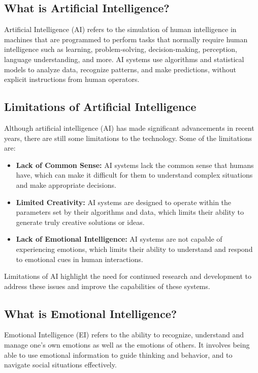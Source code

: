 \subsection{What is Artificial Intelligence?}
Artificial Intelligence (AI) refers to the simulation of human intelligence in machines that are programmed to perform tasks that normally require human intelligence such as learning, problem-solving, decision-making, perception, language understanding, and more\cite{ISSN-2456-2165}. AI systems use algorithms and statistical models to analyze data, recognize patterns, and make predictions, without explicit instructions from human operators.

\subsection{Limitations of Artificial Intelligence}
Although artificial intelligence (AI) has made significant advancements in recent years, there are still some limitations to the technology. Some of the limitations are:
\begin{itemize}
	\item \textbf{Lack of Common Sense:} AI systems lack the common sense that humans have, which can make it difficult for them to understand complex situations and make appropriate decisions.
	\item \textbf{Limited Creativity:} AI systems are designed to operate within the parameters set by their algorithms and data, which limits their ability to generate truly creative solutions or ideas.
	\item \textbf{Lack of Emotional Intelligence:} AI systems are not capable of experiencing emotions, which limits their ability to understand and respond to emotional cues in human interactions.
\end{itemize}
Limitations of AI highlight the need for continued research and development to address these issues and improve the capabilities of these systems.

\subsection{What is Emotional Intelligence?}
Emotional Intelligence (EI) refers to the ability to recognize, understand and manage one's own emotions as well as the emotions of others. It involves being able to use emotional information to guide thinking and behavior, and to navigate social situations effectively\cite{ISSN-2456-2165}.


